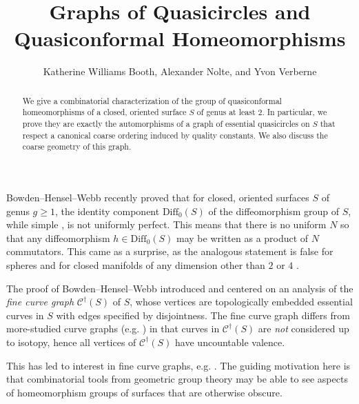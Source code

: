 \documentclass[12pt,a4paper]{amsart}
\theoremstyle{definition}
\theoremstyle{plain}
\numberwithin{equation}{section}
\begin{document}
\title{Graphs of Quasicircles and Quasiconformal Homeomorphisms}
\author{Katherine Williams Booth, Alexander Nolte, and Yvon Verberne}
\date{}

\begin{abstract}
    We give a combinatorial characterization of the group of quasiconformal homeomorphisms of a closed, oriented surface $S$ of genus at least $2$.
    In particular, we prove they are exactly the automorphisms of a graph of essential quasicircles on $S$ that respect a canonical coarse ordering induced by quality constants. We also discuss the coarse geometry of this graph.
\end{abstract}
\maketitle



Bowden--Hensel--Webb recently proved \cite{bowden2022quasimorphisms} that for closed, oriented surfaces $S$ of genus $g\geq 1$, the identity component $\text{Diff}_0(S)$ of the diffeomorphism group of $S$, while simple \cite{thurston1974foliations}, is not uniformly perfect. This means that there is no uniform $N$ so that any diffeomorphism $h \in \text{Diff}_0(S)$ may be written as a product of $N$ commutators. This came as a surprise, as the analogous statement is false for spheres and for closed manifolds of any dimension other than $2$ or $4$ \cite{burago2008conjugation,tsuboi2008uniform,tsuboi2012uniform}.

The proof of Bowden--Hensel--Webb introduced and centered on an analysis of the \textit{fine curve graph} $\mathcal{C}^{\dagger}(S)$ of $S$, whose vertices are topologically embedded essential curves in $S$ with edges specified by disjointness. The fine curve graph differs from more-studied curve graphs (e.g. \cite{behrstock2006asymptotic,bestvinaBromberg2019asymptotic,bestvinaFujiwara2002bounded,harer1985stability,masur1999geometry,masurMinsky2000geometryII}) in that curves in $\mathcal{C}^\dagger(S)$ are \textit{not} considered up to isotopy, hence all vertices of $\mathcal{C}^\dagger(S)$ have uncountable valence.

This has led to interest in fine curve graphs, e.g. \cite{boothMinahanShapiro2023automorphisms,bowdenHenselMannMiltonWebb2022rotation,guiheneufMiliton2024parabolic,leRouxWolff2024automorphisms,long2023automorphisms}.
The guiding motivation here is that combinatorial tools from geometric group theory may be able to see aspects of homeomorphism groups of surfaces that are otherwise obscure.
\end{document}
